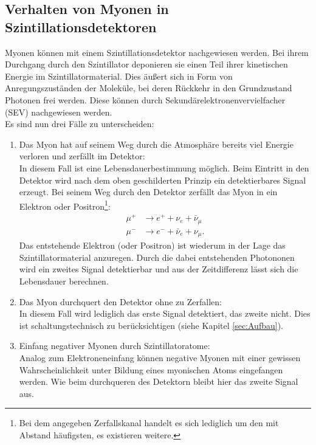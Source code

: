  \subsection{Verhalten von Myonen in Szintillationsdetektoren}
  Myonen können mit einem Szintillationsdetektor nachgewiesen werden. Bei ihrem Durchgang
  durch den Szintillator deponieren sie einen Teil ihrer kinetischen Energie im Szintillatormaterial.
  Dies äußert sich in Form von Anregungszuständen der Moleküle, bei deren Rückkehr in
  den Grundzustand Photonen frei werden. Diese können durch Sekundärelektronenvervielfacher
  (SEV) nachgewiesen werden.\\
  Es sind nun drei Fälle zu unterscheiden:
    \begin{enumerate}
    \item Das Myon hat auf seinem Weg durch die Atmosphäre bereits viel Energie
    verloren und zerfällt im Detektor:\\
    In diesem Fall ist eine Lebensdauerbestimmung möglich. Beim Eintritt in den Detektor
    wird nach dem oben geschilderten Prinzip ein detektierbares Signal erzeugt. Bei
    seinem Weg durch den Detektor zerfällt das Myon in ein Elektron oder Positron\footnote{
    Bei dem angegeben Zerfallskanal handelt es sich lediglich um den mit Abstand häufigsten,
    es existieren weitere.}:
    \begin{align*}
      \mu^+ &\to e^+ + \nu_{e} + \bar{\nu}_{\mu}\\
      \mu^- &\to e^- + \bar{\nu}_{e} +  \nu_{\mu}.
    \end{align*}
    Das entstehende Elektron (oder Positron) ist wiederum in der Lage das Szintillatormaterial anzuregen.
    Durch die dabei entstehenden Photononen wird ein zweites Signal detektierbar
    und aus der Zeitdifferenz lässt sich die Lebensdauer berechnen.
    \item Das Myon durchquert den Detektor ohne zu Zerfallen:\\
    In diesem Fall wird lediglich das erste Signal detektiert, das zweite nicht.
    Dies ist schaltungstechnisch zu berücksichtigen (siehe Kapitel \ref{sec:Aufbau}).
    \item Einfang negativer Myonen durch Szintillatoratome:\\
    Analog zum Elektroneneinfang können negative Myonen mit einer gewissen Wahrscheinlichkeit
    unter Bildung eines myonischen Atoms eingefangen werden. Wie beim durchqueren
    des Detektorn bleibt hier das zweite Signal aus.
    \end{enumerate}
